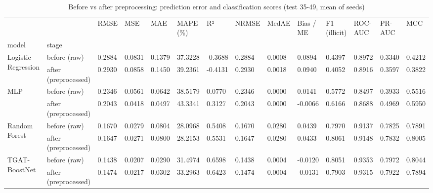 \begin{table}
\caption{Before vs after preprocessing: prediction error and classification scores (test 35-49, mean of seeds)}
\label{tab:01_before_after_preprocessing}
\begin{tabular}{llllllllllllll}
\toprule
 &  & RMSE & MSE & MAE & MAPE (\%) & R² & NRMSE & MedAE & Bias / ME & F1 (illicit) & ROC-AUC & PR-AUC & MCC \\
model & stage &  &  &  &  &  &  &  &  &  &  &  &  \\
\midrule
\multirow[t]{2}{*}{Logistic Regression} & before (raw) & 0.2884 & 0.0831 & 0.1379 & 37.3228 & -0.3688 & 0.2884 & 0.0008 & 0.0894 & 0.4397 & 0.8972 & 0.3340 & 0.4212 \\
 & after (preprocessed) & 0.2930 & 0.0858 & 0.1450 & 39.2361 & -0.4131 & 0.2930 & 0.0018 & 0.0940 & 0.4052 & 0.8916 & 0.3597 & 0.3822 \\
\cline{1-14}
\multirow[t]{2}{*}{MLP} & before (raw) & 0.2346 & 0.0561 & 0.0642 & 38.5179 & 0.0770 & 0.2346 & 0.0000 & 0.0141 & 0.5772 & 0.8497 & 0.3933 & 0.5516 \\
 & after (preprocessed) & 0.2043 & 0.0418 & 0.0497 & 43.3341 & 0.3127 & 0.2043 & 0.0000 & -0.0066 & 0.6166 & 0.8688 & 0.4969 & 0.5950 \\
\cline{1-14}
\multirow[t]{2}{*}{Random Forest} & before (raw) & 0.1670 & 0.0279 & 0.0804 & 28.0968 & 0.5408 & 0.1670 & 0.0280 & 0.0439 & 0.7970 & 0.9137 & 0.7825 & 0.7891 \\
 & after (preprocessed) & 0.1647 & 0.0271 & 0.0800 & 28.2153 & 0.5531 & 0.1647 & 0.0280 & 0.0433 & 0.8061 & 0.9148 & 0.7832 & 0.8005 \\
\cline{1-14}
\multirow[t]{2}{*}{TGAT-BoostNet} & before (raw) & 0.1438 & 0.0207 & 0.0290 & 31.4974 & 0.6598 & 0.1438 & 0.0004 & -0.0120 & 0.8051 & 0.9353 & 0.7972 & 0.8044 \\
 & after (preprocessed) & 0.1474 & 0.0217 & 0.0302 & 33.2963 & 0.6423 & 0.1474 & 0.0004 & -0.0131 & 0.7903 & 0.9315 & 0.7922 & 0.7894 \\
\cline{1-14}
\bottomrule
\end{tabular}
\end{table}
